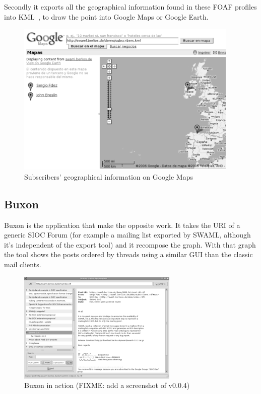 \documentclass{llncs}
\begin{document}
Secondly it exports all the geographical information found in these FOAF profiles into 
KML~\cite{KML}, to draw the point into Google Maps or Google Earth.

\begin{figure}[ht]
 \centering
 \includegraphics[bb=0 0 400 280]{images/googlemaps.png}
 \caption{Subscribers' geographical information on Google Maps}
\end{figure}

\subsection{Buxon}

Buxon is the application that make the opposite work. It takes the URI of a generic SIOC 
Forum (for example a mailing list exported by SWAML, although it's independent of the 
export tool) and it recompose the graph. With that graph the tool shows the posts ordered 
by threads using a similar GUI than the classic mail clients.

\begin{figure}[ht]
 \centering
 \includegraphics[bb=0 0 288 202]{images/buxon.png}
 \caption{Buxon in action (FIXME: add a screenshot of v0.0.4)}
\end{figure}
\end{document}
